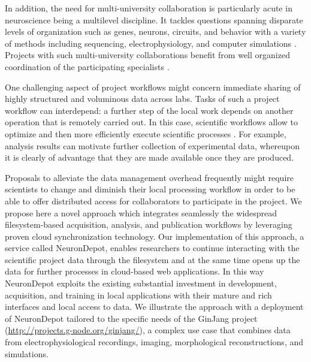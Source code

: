 \documentclass{frontiersSCNS} %
\begin{document}
In addition, the need for multi-university collaboration is particularly acute
in neuroscience being a multilevel discipline. It tackles questions spanning
disparate levels of organization such as genes, neurons, circuits, and behavior
with a variety of methods including sequencing, electrophysiology, and computer
simulations \citep{shepherd_human_1998}. Projects with such multi-university
collaborations benefit from well organized coordination of the participating
specialists \citep{cummings_coordination_2007}.

One challenging aspect of project workflows might concern immediate sharing of
highly structured and voluminous data across labs. Tasks of such a project
workflow can interdepend: a further step of the local work depends on another
operation that is remotely carried out. In this case, scientific workflows
allow to optimize and then more efficiently execute scientific processes
\citep{ludascher_scientific_2009}. For example, analysis results can motivate
further collection of experimental data, whereupon it is clearly of advantage that
they are made available once they are produced.

Proposals to alleviate the data management overhead frequently might require
scientists to change and diminish their local processing workflow in order to
be able to offer distributed access for collaborators to participate in the
project. We propose here a novel approach which integrates seamlessly the
widespread filesystem-based acquisition, analysis, and publication workflows by
leveraging proven cloud synchronization technology. Our implementation of this
approach, a service called NeuronDepot, enables researchers to continue
interacting with the scientific project data through the filesystem and at the
same time opens up the data for further processes in cloud-based web
applications. In this way NeuronDepot exploits the existing substantial
investment in development, acquisition, and training in local applications with
their mature and rich interfaces and local access to data. We illustrate the
approach with a deployment of NeuronDepot tailored to the specific needs of the
GinJang project (\url{http://projects.g-node.org/ginjang/}), a complex use case
that combines data from electrophysiological recordings, imaging, morphological
reconstructions, and simulations.
\end{document}
